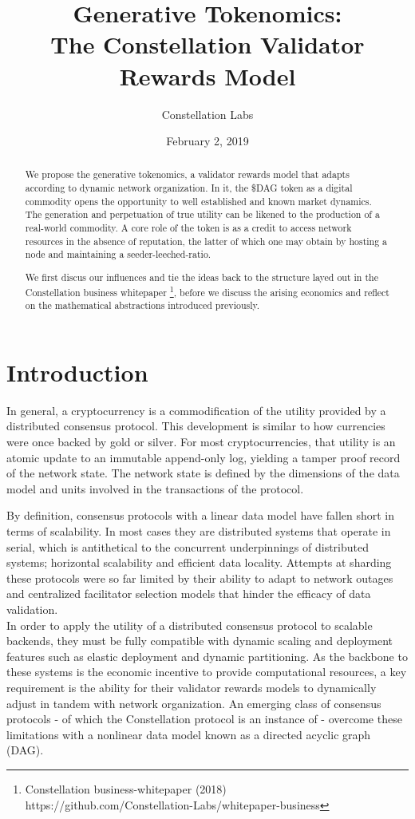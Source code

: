 \documentclass{article}
\title{Generative Tokenomics:\\ The Constellation Validator Rewards Model}
\author{Constellation Labs}
\date{February 2, 2019}
\begin{document}
\maketitle

\begin{abstract}
We propose the generative tokenomics, a validator rewards model that adapts according to dynamic network organization. In it, the \$DAG token as a digital commodity opens the opportunity to well established and known market dynamics. The generation and perpetuation of true utility can be likened to the production of a real-world commodity. A core role of the token is as a credit to access network resources in the absence of reputation, the latter of which one may obtain by hosting a node and maintaining a seeder-leeched-ratio.

We first discus our influences and tie the ideas back to the structure layed out in the Constellation business whitepaper
\footnote{Constellation business-whitepaper (2018)\\ https://github.com/Constellation-Labs/whitepaper-business}, 
before we discuss the arising economics and reflect on the mathematical abstractions introduced previously. 
\end{abstract}

\tableofcontents

\setcounter{secnumdepth}{0}
\section{Introduction}
In general, a cryptocurrency is a commodification of the utility provided by a distributed consensus protocol. This development is similar to how currencies were once backed by gold or silver. For most cryptocurrencies, that utility is an atomic update to an immutable append-only log, yielding a tamper proof record of the network state. The network state is defined by the dimensions of the data model and units involved in the transactions of the protocol. 

By definition, consensus protocols with a linear data model have fallen short in terms of scalability. In most cases they are distributed systems that operate in serial, which is antithetical to the concurrent underpinnings of distributed systems; horizontal scalability and efficient data locality. Attempts at sharding these protocols were so far limited by their ability to adapt to network outages and centralized facilitator selection models that hinder the efficacy of data validation. \\
In order to apply the utility of a distributed consensus protocol to scalable backends, they must be fully compatible with dynamic scaling and deployment features such as elastic deployment and dynamic partitioning. As the backbone to these systems is the economic incentive to provide computational resources, a key requirement is the ability for their validator rewards models to dynamically adjust in tandem with network organization. An emerging class of consensus protocols - of which the Constellation protocol is an instance of - overcome these limitations with a nonlinear data model known as a directed acyclic graph (DAG).
\end{document}
